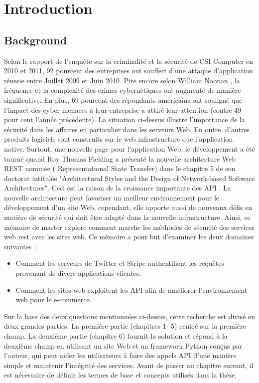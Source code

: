 \chapter{Introduction}
\label{chp: chap1}

\section{Background}
Selon le rapport de l'enquête sur la criminalité et la sécurité de CSI Computer en 2010 et 2011, 92 pourcent des entreprises ont souffert d'une attaque d'application réussie entre Juillet 2009 et Juin 2010. Pire encore selon William Noonan \cite{14}, la fréquence et la complexité des crimes cybernétiques ont augmenté de manière significative. En plus, 69 pourcent des répondants américains ont souligné que l'impact des cyber-menaces à leur entreprise a attiré leur attention (contre 49 pour cent l'année précédente). La situation ci-dessus illustre l'importance de la sécurité dans les affaires en particulier dans les serveurs Web. En outre, d'autres produits logiciels sont construits sur le web infrastructure que l'application native. Surtout, une nouvelle page pour l'application Web,  le développement a été tourné quand Roy Thomas Fielding a présenté la nouvelle architecture  Web REST nommée ( Representational State Transfer) dans le chapitre 5 de son doctorat  intitulée "Architectural Styles and the Design of Network-based Software Architectures". Ceci est la raison de la croissance importante des API \cite{1}. La nouvelle architecture peut favoriser un meilleur environnement pour le développement d’un site Web, cependant, elle apporte aussi de nouveaux défis en matière de sécurité qui doit être adapté dans la nouvelle infrastructure. Ainsi, ce mémoire de master explore comment marche les méthodes de sécurité des services web rest avec les sites web.
Ce mémoire a pour but d'examiner les deux domaines suivantes :
\begin{itemize}
\item Comment les serveurs de Twitter et Stripe authentifient les requêtes provenant de divers applications clientes.
\item Comment les sites web exploitent les API afin de améliorer l'environnement web pour le e-commerce.
\end{itemize}
Sur la base des deux questions mentionnées ci-dessus, cette recherche est divisé en deux grandes parties. La première partie (chapitres 1- 5) centré sur la première champ. La deuxième partie (chapitre 6) fournit la solution et répond à la deuxième champ en utilisant un site Web et un framework Python conçus par l'auteur, qui peut aider les utilisateurs à faire des appels API d'une manière simple et maintenir l'intégrité des services.
Avant de passer au chapitre suivant, il est nécessaire de définir les termes de base et
concepts utilisés dans la thèse.


